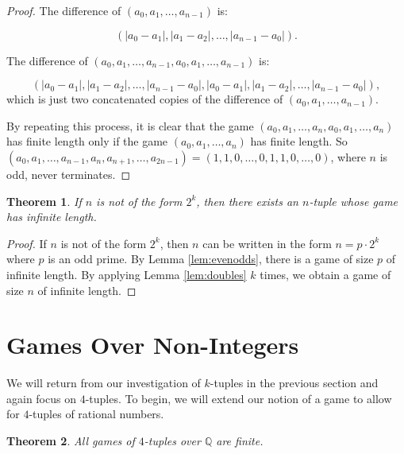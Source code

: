 \documentclass[12pt]{amsart}
\newtheorem{theorem}{Theorem}[section]
\newcommand{\breathe}{\vspace{0.2cm}}
\begin{document}
\begin{proof}

The difference of $(a_0, a_1, \ldots, a_{n-1})$ is:

$$(|a_0 - a_1|, |a_1 - a_2|, \ldots, |a_{n-1} - a_0|).$$

\breathe

The difference of $(a_0, a_1, \ldots, a_{n-1}, a_0, a_1, \ldots, a_{n-1})$ is:

$$(|a_0 - a_1|, |a_1 - a_2|, \ldots, |a_{n-1} - a_0|, |a_0 - a_1|, |a_1 - a_2|, \ldots, |a_{n-1} - a_0|),$$
which is just two concatenated copies of the difference of $(a_0, a_1, \ldots, a_{n-1})$.

By repeating this process, it is clear that the game $(a_0, a_1, \ldots, a_n, a_0, a_1, \ldots, a_n)$ has finite length only if the game $(a_0, a_1, \ldots, a_n)$ has finite length. So $(a_0, a_1, \ldots, a_{n-1}, a_n, a_{n+1}, \ldots, a_{2n-1}) = (1, 1, 0, \ldots, 0, 1, 1, 0, \ldots, 0)$, where $n$ is odd, never terminates. 

\end{proof}

\begin{theorem}
\label{theorem:notPowersOfTwo}
If $n$ is not of the form $2^k$, then there exists an $n$-tuple whose game has infinite length.
\end{theorem}

\begin{proof}

If $n$ is not of the form $2^k$, then $n$ can be written in the form $n = p \cdot 2^k$ where $p$ is an odd prime. By Lemma \ref{lem:evenodds}, there is a game of size $p$ of infinite length. By applying Lemma \ref{lem:doubles} $k$ times, we obtain a game of size $n$ of infinite length. 
\end{proof}



\section{Games Over Non-Integers\label{sec:nonIntegers}}

We will return from our investigation of $k$-tuples in the previous section and again focus on $4$-tuples. To begin, we will extend our notion of a game to allow for $4$-tuples of rational numbers.

\begin{theorem}
All games of $4$-tuples over $\mathbb{Q}$ are finite.
\end{theorem}
\end{document}
